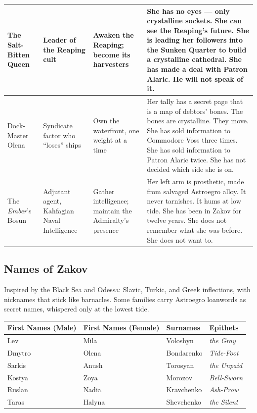 \begin{longtable}{|p{}|p{}|p{}|p{}|}
\hline
The Salt-Bitten Queen & Leader of the Reaping cult & Awaken the Reaping; become its harvesters & She has no eyes --- only crystalline sockets. She can see the Reaping's future. She is leading her followers into the Sunken Quarter to build a crystalline cathedral. She has made a deal with Patron Alaric. He will not speak of it. \\
\hline
Dock-Master Olena & Syndicate factor who ``loses'' ships & Own the waterfront, one weight at a time & Her tally has a secret page that is a map of debtors' bones. The bones are crystalline. They move. She has sold information to Commodore Voss three times. She has sold information to Patron Alaric twice. She has not decided which side she is on. \\
\hline
The \emph{Ember}'s Bosun & Adjutant agent, Kahfagian Naval Intelligence & Gather intelligence; maintain the Admiralty's presence & Her left arm is prosthetic, made from salvaged Astroegro alloy. It never tarnishes. It hums at low tide. She has been in Zakov for twelve years. She does not remember what she was before. She does not want to. \\
\hline
\end{longtable}

\subsection*{Names of Zakov}
\label{sec:zakov-names}

Inspired by the Black Sea and Odessa: Slavic, Turkic, and Greek inflections, with nicknames that stick like barnacles. Some families carry Astroegro loanwords as secret names, whispered only at the lowest tide.

\begin{longtable}{|p{}|p{}|p{}|p{}|}
\hline
\textbf{First Names (Male)} & \textbf{First Names (Female)} & \textbf{Surnames} & \textbf{Epithets} \\
\hline
Lev & Mila & Voloshyn & \textit{the Gray} \\
\hline
Dmytro & Olena & Bondarenko & \textit{Tide-Foot} \\
\hline
Sarkis & Anush & Torosyan & \textit{the Unpaid} \\
\hline
Kostya & Zoya & Morozov & \textit{Bell-Sworn} \\
\hline
Ruslan & Nadia & Kravchenko & \textit{Ash-Prow} \\
\hline
Taras & Halyna & Shevchenko & \textit{the Silent} \\
\hline
\end{longtable}

